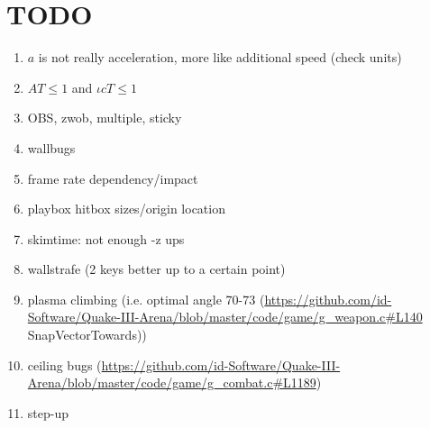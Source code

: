 \section{TODO}
\label{sec:todo}

\begin{enumerate}
  \item $a$ is not really acceleration, more like additional speed (check units)
  \item $AT \le 1$ and $\iota cT \le 1$
  \item OBS, zwob, multiple, sticky
  \item wallbugs
  \item frame rate dependency/impact
  \item playbox hitbox sizes/origin location
  \item skimtime: not enough -z ups
  \item wallstrafe (2 keys better up to a certain point)
  \item plasma climbing (i.e. optimal angle 70-73 (\url{https://github.com/id-Software/Quake-III-Arena/blob/master/code/game/g_weapon.c#L140} SnapVectorTowards))
  \item ceiling bugs (\url{https://github.com/id-Software/Quake-III-Arena/blob/master/code/game/g_combat.c#L1189})
  \item step-up
\end{enumerate}
